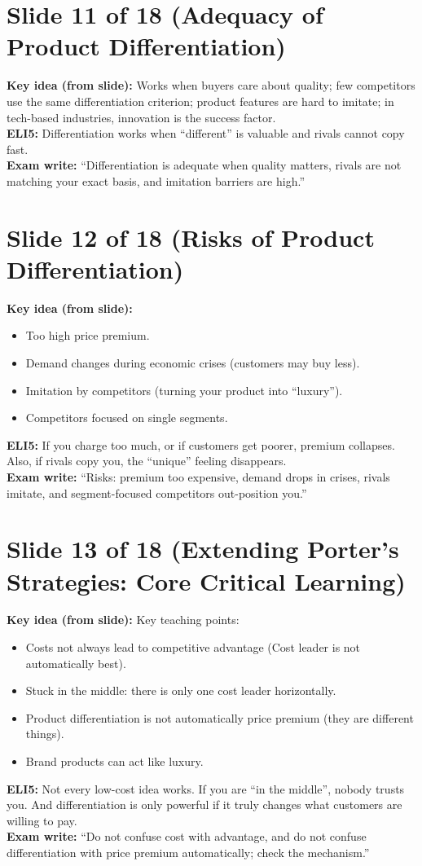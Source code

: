 \documentclass[11pt,a4paper]{article}
\begin{document}
\section*{Slide 11 of 18 (Adequacy of Product Differentiation)}
\textbf{Key idea (from slide):} Works when buyers care about quality; few competitors use the same differentiation criterion; product features are hard to imitate; in tech-based industries, innovation is the success factor.\\
\textbf{ELI5:} Differentiation works when ``different'' is valuable and rivals cannot copy fast.\\
\textbf{Exam write:} ``Differentiation is adequate when quality matters, rivals are not matching your exact basis, and imitation barriers are high.''

\section*{Slide 12 of 18 (Risks of Product Differentiation)}
\textbf{Key idea (from slide):}
\begin{itemize}
  \item Too high price premium.
  \item Demand changes during economic crises (customers may buy less).
  \item Imitation by competitors (turning your product into ``luxury'').
  \item Competitors focused on single segments.
\end{itemize}
\textbf{ELI5:} If you charge too much, or if customers get poorer, premium collapses. Also, if rivals copy you, the ``unique'' feeling disappears.\\
\textbf{Exam write:} ``Risks: premium too expensive, demand drops in crises, rivals imitate, and segment-focused competitors out-position you.''

\section*{Slide 13 of 18 (Extending Porter’s Strategies: Core Critical Learning)}
\textbf{Key idea (from slide):} Key teaching points:
\begin{itemize}
  \item Costs not always lead to competitive advantage (Cost leader is not automatically best).
  \item Stuck in the middle: there is only one cost leader horizontally.
  \item Product differentiation is not automatically price premium (they are different things).
  \item Brand products can act like luxury.
\end{itemize}
\textbf{ELI5:} Not every low-cost idea works. If you are ``in the middle'', nobody trusts you. And differentiation is only powerful if it truly changes what customers are willing to pay.\\
\textbf{Exam write:} ``Do not confuse cost with advantage, and do not confuse differentiation with price premium automatically; check the mechanism.''
\end{document}
